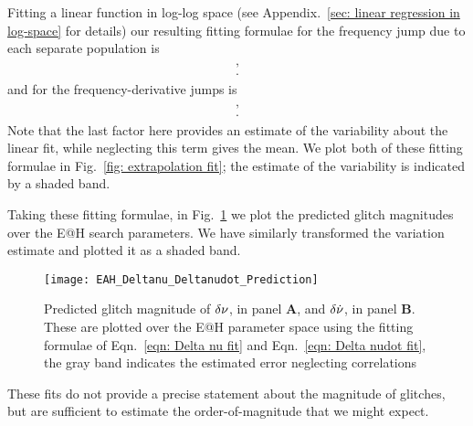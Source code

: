 \documentclass[../full_thesis/full_thesis.tex]{subfiles}
\newcommand{\thisdir}{../glitches_in_CGW}
\begin{document}
Fitting a linear function in log-log space (see Appendix.~\ref{sec: linear regression in log-space} for details) our resulting fitting formulae for
the frequency jump due to each separate population is
\begin{align}
\begin{split}
,\\
.
\end{split}
\label{eqn: Delta nu fit}
\end{align}
and for the frequency-derivative jumps is
\begin{align}
\begin{split}
,\\
.
\end{split}
\label{eqn: Delta nudot fit}
\end{align}
Note that the last factor here provides
an estimate of the variability about the linear fit, while neglecting this term
gives the mean.
We plot both of these fitting formulae in Fig.~\ref{fig: extrapolation fit};
the estimate of the variability is indicated by a shaded band.

Taking these fitting formulae, in Fig.~\ref{fig: EAH Delta nu nudot prediction} we plot
the predicted glitch magnitudes over the E@H search parameters. We have similarly
transformed the variation estimate and plotted it as a shaded band.
\begin{figure}[htb]
\centering
\texttt{[image: EAH\_Deltanu\_Deltanudot\_Prediction]}
\caption{Predicted glitch magnitude of $\delta\nu$, in panel \textbf{A}, and
$\delta\dot{\nu}$, in panel \textbf{B}. These are plotted over the E@H parameter
space using the fitting formulae of Eqn.~\eqref{eqn: Delta nu fit} and
Eqn.~\eqref{eqn: Delta nudot fit}, the gray band indicates the estimated error
neglecting correlations}
\label{fig: EAH Delta nu nudot prediction}
\end{figure}
These fits do not provide a precise statement about the magnitude of glitches,
but are sufficient to estimate the order-of-magnitude that we might expect.
\end{document}
